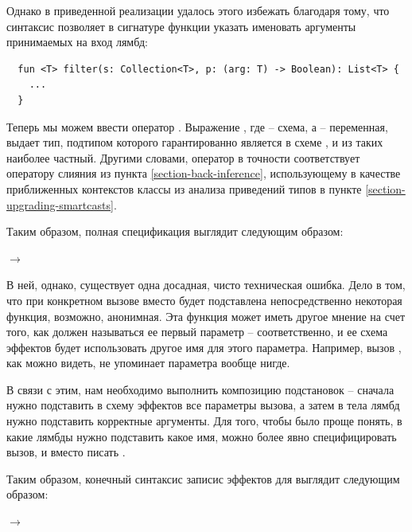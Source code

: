 Однако в приведенной реализации удалось этого избежать благодаря тому, что синтаксис  позволяет в сигнатуре функции указать именовать аргументы принимаемых на вход лямбд:

\begin{verbatim}
  fun <T> filter(s: Collection<T>, p: (arg: T) -> Boolean): List<T> {
    ...
  }
\end{verbatim}

Теперь мы можем ввести оператор . Выражение , где  -- схема, а  -- переменная, выдает тип, подтипом которого гарантированно является  в схеме , и из таких наиболее частный. Другими словами, оператор  в точности соответствует оператору слияния из пункта \ref{section-back-inference}, использующему в качестве приближенных контекстов классы  из анализа приведений типов в пункте \ref{section-upgrading-smartcasts}.

Таким образом, полная спецификация  выглядит следующим образом:

{
   $\rightarrow$ 
}{}

В ней, однако, существует одна досадная, чисто техническая ошибка. Дело в том, что при конкретном вызове  вместо  будет подставлена непосредственно некоторая функция, возможно, анонимная. Эта функция может иметь другое мнение на счет того, как должен называться ее первый параметр -- соответственно, и ее схема эффектов будет использовать другое имя для этого параметра. Например, вызов , как можно видеть, не упоминает параметра  вообще нигде.

В связи с этим, нам необходимо выполнить композицию подстановок -- сначала нужно подставить в схему эффектов  все параметры вызова, а затем в тела лямбд нужно подставить корректные аргументы. Для того, чтобы было проще понять, в какие лямбды нужно подставить какое имя, можно более явно специфицировать вызов, и вместо  писать .

Таким образом, конечный синтаксис записис эффектов для  выглядит следующим образом:

{
   $\rightarrow$  
}
{}
